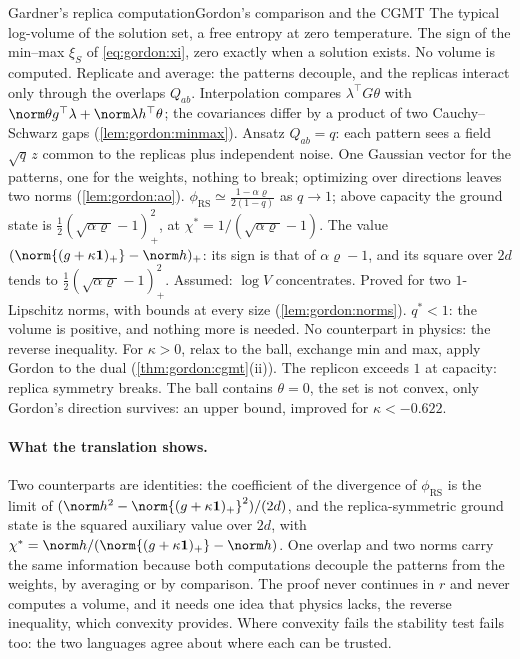 \begin{refsection}
\begin{stone}{Gardner's replica computation}{Gordon's comparison and the CGMT}
{The typical log-volume of the solution set, a free entropy at zero temperature.}
{The sign of the min--max $\xi_S$ of \eqref{eq:gordon:xi}, zero exactly when a solution exists. No volume is computed.}
{Replicate and average: the patterns decouple, and the replicas interact only through the overlaps $Q_{ab}$.}
{Interpolation compares $\lambda^\top G\theta$ with $\norm\theta g^\top\lambda+\norm\lambda h^\top\theta$; the covariances differ by a product of two Cauchy--Schwarz gaps (\cref{lem:gordon:minmax}).}
{Ansatz $Q_{ab}=q$: each pattern sees a field $\sqrt q\,z$ common to the replicas plus independent noise.}
{One Gaussian vector for the patterns, one for the weights, nothing to break; optimizing over directions leaves two norms (\cref{lem:gordon:ao}).}
{$\phi_{\mathrm{RS}}\simeq\frac{1-\alpha\varrho}{2(1-q)}$ as $q\to1$; above capacity the ground state is $\frac12(\sqrt{\alpha\varrho}-1)_+^2$, at $\chi^*=1/(\sqrt{\alpha\varrho}-1)$.}
{The value $(\norm{(g+\kappa\mathbf 1)_+}-\norm h)_+$: its sign is that of $\alpha\varrho-1$, and its square over $2d$ tends to $\frac12(\sqrt{\alpha\varrho}-1)_+^2$.}
{Assumed: $\log V$ concentrates.}
{Proved for two $1$-Lipschitz norms, with bounds at every size (\cref{lem:gordon:norms}).}
{$q^*<1$: the volume is positive, and nothing more is needed.}
{No counterpart in physics: the reverse inequality. For $\kappa>0$, relax to the ball, exchange min and max, apply Gordon to the dual (\cref{thm:gordon:cgmt}(ii)).}
{The replicon exceeds $1$ at capacity: replica symmetry breaks.}
{The ball contains $\theta=0$, the set is not convex, only Gordon's direction survives: an upper bound, improved for $\kappa<-0.622$.}
\end{stone}

\paragraph{What the translation shows.} Two counterparts are identities: the coefficient of the divergence of $\phi_{\mathrm{RS}}$ is the limit of $(\norm h^2-\norm{(g+\kappa\mathbf 1)_+}^2)/(2d)$, and the replica-symmetric ground state is the squared auxiliary value over $2d$, with $\chi^*=\norm h/(\norm{(g+\kappa\mathbf 1)_+}-\norm h)$. One overlap and two norms carry the same information because both computations decouple the patterns from the weights, by averaging or by comparison. The proof never continues in $r$ and never computes a volume, and it needs one idea that physics lacks, the reverse inequality, which convexity provides. Where convexity fails the stability test fails too: the two languages agree about where each can be trusted.


\end{refsection}
